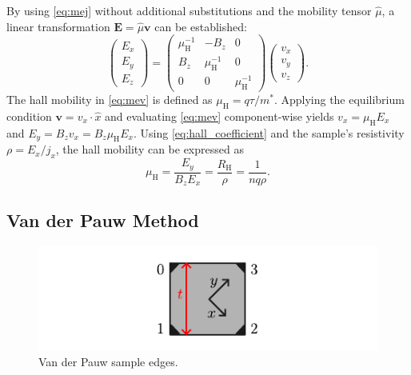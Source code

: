 By using \cref{eq:mej} without additional substitutions and the mobility tensor 
$\hat{\mu}$, a linear transformation $\mathbf{E}=\hat{\mu} \mathbf{v}$ 
can be established:
\begin{equation}
	\begin{pmatrix}
		E_{x} \\
		E_{y} \\
		E_{z}
	\end{pmatrix}
	=\begin{pmatrix}
		\mu_\mathrm{H}^{-1} & -B_{z}              & 0                   \\
		B_{z}               & \mu_\mathrm{H}^{-1} & 0                   \\
		0                   & 0                   & \mu_\mathrm{H}^{-1}
	\end{pmatrix}
	\begin{pmatrix}
		v_{x} \\
		v_{y} \\
		v_{z}
	\end{pmatrix}.
	\label{eq:mev}
\end{equation}
The hall mobility in \cref{eq:mev} is defined as $\mu_{\mathrm{H}}= q\tau / m^{*}$.
Applying the equilibrium condition $\mathbf{v}=v_x \cdot \hat{x}$ and evaluating 
\cref{eq:mev} component-wise yields $v_{x} = \mu_{\mathrm{H}}E_{x}$ and 
$E_{y}=B_{z}v_{x}=B_{z}\mu_{\mathrm{H}}E_{x}$.
Using \cref{eq:hall_coefficient} and the sample's resistivity $\rho=E_x / j_x$, 
the hall mobility can be expressed as
\begin{equation}
	\mu_{\mathrm{H}}=\frac{E_y}{B_z E_x} =\frac{R_{\mathrm{H}}}{\rho} =\frac{1}{nq\rho}.
	\label{eq:hall_mobility}
\end{equation}

\subsection{Van der Pauw Method}
\begin{figure}
	\centering
	\includegraphics{../assets/van_der_pauw.pdf}
	\caption{Van der Pauw sample edges.}
	\label{fig:van_der_pauw}
\end{figure}

